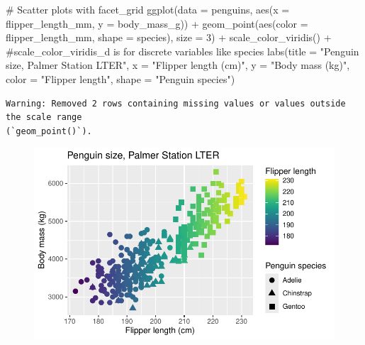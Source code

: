 \documentclass[
  letterpaper,
  DIV=11,
  numbers=noendperiod]{scrreprt}
\newenvironment{Shaded}{\begin{snugshade}}{\end{snugshade}}
\newcommand{\AttributeTok}[1]{\textcolor[rgb]{0.40,0.45,0.13}{#1}}
\newcommand{\CommentTok}[1]{\textcolor[rgb]{0.37,0.37,0.37}{#1}}
\newcommand{\DecValTok}[1]{\textcolor[rgb]{0.68,0.00,0.00}{#1}}
\newcommand{\FunctionTok}[1]{\textcolor[rgb]{0.28,0.35,0.67}{#1}}
\newcommand{\NormalTok}[1]{\textcolor[rgb]{0.00,0.23,0.31}{#1}}
\newcommand{\SpecialCharTok}[1]{\textcolor[rgb]{0.37,0.37,0.37}{#1}}
\newcommand{\StringTok}[1]{\textcolor[rgb]{0.13,0.47,0.30}{#1}}
\begin{document}
\begin{Shaded}
\begin{Highlighting}[]
\CommentTok{\# Scatter plots with facet\_grid}
\FunctionTok{ggplot}\NormalTok{(}\AttributeTok{data =}\NormalTok{ penguins, }\FunctionTok{aes}\NormalTok{(}\AttributeTok{x =}\NormalTok{ flipper\_length\_mm, }\AttributeTok{y =}\NormalTok{ body\_mass\_g)) }\SpecialCharTok{+}
  \FunctionTok{geom\_point}\NormalTok{(}\FunctionTok{aes}\NormalTok{(}\AttributeTok{color =}\NormalTok{ flipper\_length\_mm, }\AttributeTok{shape =}\NormalTok{ species), }\AttributeTok{size =} \DecValTok{3}\NormalTok{) }\SpecialCharTok{+}
  \FunctionTok{scale\_color\_viridis}\NormalTok{() }\SpecialCharTok{+} \CommentTok{\#scale\_color\_viridis\_d is for discrete variables like species}
  \FunctionTok{labs}\NormalTok{(}\AttributeTok{title =} \StringTok{"Penguin size, Palmer Station LTER"}\NormalTok{,}
       \AttributeTok{x =} \StringTok{"Flipper length (cm)"}\NormalTok{,}
       \AttributeTok{y =} \StringTok{"Body mass (kg)"}\NormalTok{,}
       \AttributeTok{color =} \StringTok{"Flipper length"}\NormalTok{,}
       \AttributeTok{shape =} \StringTok{"Penguin species"}\NormalTok{)}
\end{Highlighting}
\end{Shaded}

\begin{verbatim}
Warning: Removed 2 rows containing missing values or values outside the scale range
(`geom_point()`).
\end{verbatim}

\begin{figure}[H]

{\centering \includegraphics{scripts/02_dataViz/class4_files/figure-pdf/viridis-1.pdf}

}

\end{figure}
\end{document}
